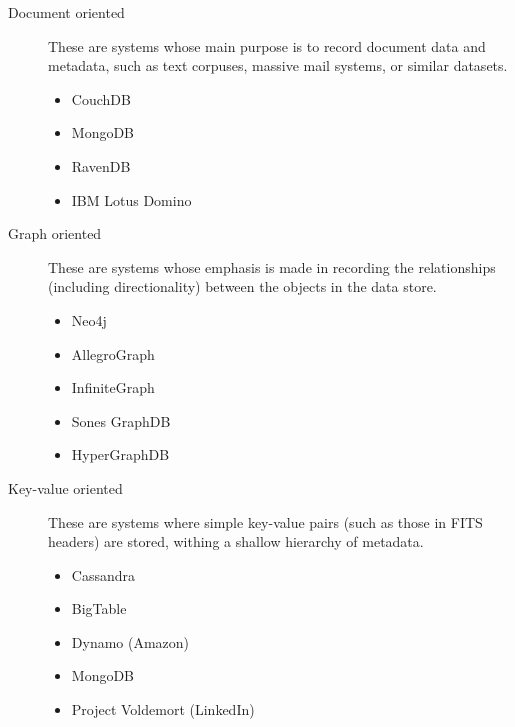 \begin{description} %

\item[Document oriented] These are systems whose main purpose is to record document data and metadata, such as text corpuses, massive mail systems, or similar datasets.

  \begin{itemize}
    \item CouchDB
    \item MongoDB
    \item RavenDB
    \item IBM Lotus Domino
  \end{itemize}

\item[Graph oriented] These are systems whose emphasis is made in recording the relationships (including directionality) between the objects in the data store.

  \begin{itemize}
    \item Neo4j
    \item AllegroGraph
    \item InfiniteGraph
    \item Sones GraphDB
    \item HyperGraphDB
  \end{itemize}

\item[Key-value oriented] These are systems where simple key-value pairs (such as those in FITS headers) are stored, withing a shallow hierarchy of metadata.


  \begin{itemize}
    \item Cassandra
    \item BigTable
    \item Dynamo (Amazon)
    \item MongoDB
    \item Project Voldemort (LinkedIn)
  \end{itemize}


\end{description}
